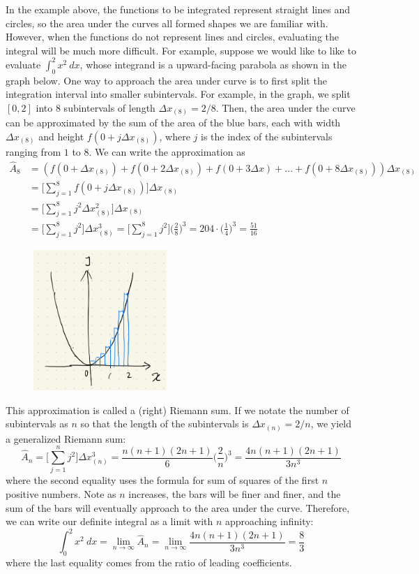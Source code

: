 In the example above, the functions to be integrated represent straight lines and circles, so the area under the curves all formed shapes we are familiar with.  However, when the functions do not represent lines and circles, evaluating the integral will be much more difficult.  For example, suppose we would like to like to evaluate $\int_0^2 x^2~dx$, whose integrand is a upward-facing parabola as shown in the graph below.  One way to approach the area under curve is to first split the integration interval into smaller subintervals.  For example, in the graph, we split $[0, 2]$ into $8$ subintervals of length $\Delta x_{(8)} = 2/8$.  Then, the area under the curve can be approximated by the sum of the area of the blue bars, each with width $\Delta x_{(8)}$ and height $f(0 + j \Delta x_{(8)})$, where $j$ is the index of the subintervals ranging from $1$ to $8$.  We can write the approximation as
\begin{align*}
    \hat{A}_8 &= (f(0 + \Delta x_{(8)}) + f(0 + 2\Delta x_{(8)}) + f(0 + 3\Delta x) + ... + f(0 + 8 \Delta x_{(8)}))\Delta x_{(8)}\\
    &= \Big[\sum_{j=1}^8 f(0+j \Delta x_{(8)})\Big]\Delta x_{(8)}\\
    &= \Big[\sum_{j=1}^8 j^2 \Delta x_{(8)}^2\Big]\Delta x_{(8)}\\
    &= \Big[\sum_{j=1}^8 j^2\Big] \Delta x_{(8)}^3 =  \Big[\sum_{j=1}^8 j^2\Big] \Big(\frac{2}{8}\Big)^3 = 204 \cdot \Big(\frac{1}{4}\Big)^3 = \frac{51}{16}
\end{align*}

\begin{figure}[ht]
    \centering
    \includegraphics[width = 0.45\textwidth]{figures/chap 07/def_int_series.png}
\end{figure}

This approximation is called a (right) Riemann sum.  If we notate the number of subintervals as $n$ so that the length of the subintervals is $\Delta x_{(n)} = 2/n$, we yield a generalized Riemann sum:
\[\hat{A}_n = \Big[\sum_{j=1}^n j^2\Big] \Delta x_{(n)}^3 = \frac{n(n+1)(2n+1)}{6} \Big(\frac{2}{n}\Big)^3 = \frac{4n(n+1)(2n+1)}{3n^3}\]
where the second equality uses the formula for sum of squares of the first $n$ positive numbers.  Note as $n$ increases, the bars will be finer and finer, and the sum of the bars will eventually approach to the area under the curve.  Therefore, we can write our definite integral as a limit with $n$ approaching infinity:
\[\int_0^2 x^2~dx = \lim_{n \rightarrow \infty} \hat{A}_n = \lim_{n \rightarrow \infty} \frac{4n(n+1)(2n+1)}{3n^3} = \frac{8}{3}\]
where the last equality comes from the ratio of leading coefficients.

